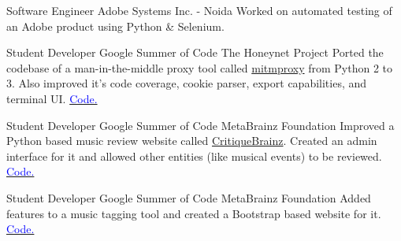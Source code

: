     {Software Engineer}
    {Adobe Systems Inc. - Noida}
    {}
    {}
    {
        Worked on automated testing of an Adobe product using Python \& Selenium.
    }
    \vspace*{0.2\baselineskip}

    {Student Developer}
    {Google Summer of Code}
    {The Honeynet Project}
    {}
    {
        Ported the codebase of a man-in-the-middle proxy tool called \href{http://github.com/mitmproxy/mitmproxy/}{mitmproxy} from Python 2 to 3. Also improved it's
        code coverage,
        cookie parser,
        export capabilities,
        and terminal UI.
        \hfill
        \href{https://github.com/mitmproxy/mitmproxy/commits?author=dufferzafar}{\textcolor{blue}{\scriptsize Code.}}
    }
    \vspace*{0.2\baselineskip}

    {Student Developer}
    {Google Summer of Code}
    {MetaBrainz Foundation}
    {}
    {
        Improved a Python based music review website called \href{http://critiquebrainz.org/}{CritiqueBrainz}.
        Created an admin interface for it
        and allowed other entities (like musical events) to be reviewed.
        \hfill
        \href{https://github.com/metabrainz/critiquebrainz/commits?author=dufferzafar}{\textcolor{blue}{\scriptsize Code.}}
    }
    \vspace*{0.2\baselineskip}

    {Student Developer}
    {Google Summer of Code}
    {MetaBrainz Foundation}
    {}
    {
        Added features to a music tagging tool and created a Bootstrap based website for it.
        \hfill
        \href{https://github.com/metabrainz/picard-website/commits?author=dufferzafar}{\textcolor{blue}{\scriptsize Code.}}
    }
    \vspace*{0.2\baselineskip}
